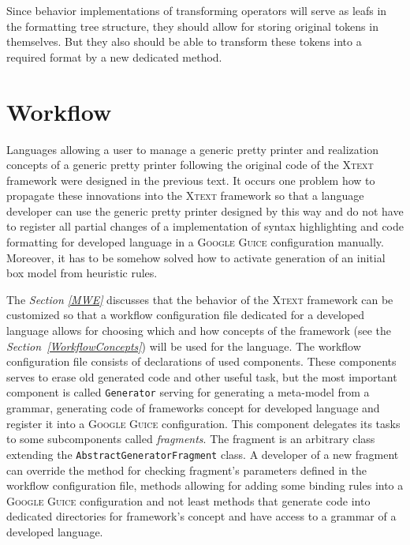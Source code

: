 \documentclass[12pt,notitlepage,a4paper]{report}
\begin{document}
Since behavior implementations of transforming operators will serve as leafs in the formatting tree structure, they should allow for storing original tokens in themselves. But they also should be able to transform these tokens into a required format by a new dedicated method.

\section{Workflow}

Languages allowing a user to manage a generic pretty printer and realization concepts of a generic pretty printer following the original code of the \textsc{Xtext} framework were designed in the previous text. It occurs one problem how to propagate these innovations into the \textsc{Xtext} framework so that a language developer can use the generic pretty printer designed by this way and do not have to register all partial changes of a implementation of syntax highlighting and code formatting for developed language in a \textsc{Google Guice} configuration manually. Moreover, it has to be somehow solved how to activate generation of an initial box model from heuristic rules.

The \textit{Section \ref{MWE}} discusses that the behavior of the \textsc{Xtext} framework can be customized so that a workflow configuration file dedicated for a developed language allows for choosing which and how concepts of the framework (see the \textit{Section~\ref{WorkflowConcepts}}) will be used for the language. The workflow configuration file consists of declarations of used components. These components serves to erase old generated code and other useful task, but the most important component is called \texttt{Generator} serving for generating a meta-model from a grammar, generating code of frameworks concept for developed language and register it into a \textsc{Google Guice} configuration. This component delegates its tasks to some subcomponents called \textit{fragments}. The fragment is an arbitrary class extending the \texttt{AbstractGeneratorFragment} class. A developer of a new fragment can override the method for checking fragment's parameters defined in the workflow configuration file, methods allowing for adding some binding rules into a \textsc{Google Guice} configuration and not least methods that generate code into dedicated directories for framework's concept and have access to a grammar of a developed language.
\end{document}
